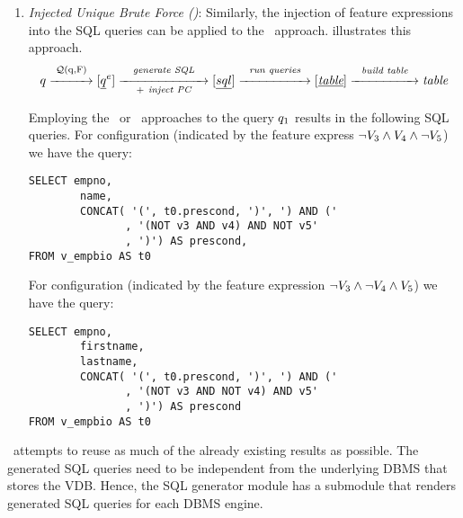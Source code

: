 \begin{enumerate}
\item 
\emph{Injected Unique Brute Force (\ubfi)}:
Similarly, the injection of feature expressions into the SQL queries can be applied to
the \ubf\ approach.  illustrates this approach.
%
\[
\vQ \mathrel{\mathop{\xrightarrow{\hspace*{1cm}}}^{\mathrm{\qGroup \vQ}}} [ \annot [\dimMeta] {\pQ} ] 
\mathrel{\mathop{\xrightarrow{\hspace*{2.3cm}}}^{\mathrm{\textit{generate SQL}}}_{\mathrm{+ \ \textit{inject PC}}}} [ {\sqlQ} ]
\mathrel{\mathop{\xrightarrow{\hspace*{1.8cm}}}^{\mathrm{\textit{run queries}}}
} [\underline{\textit{table}}]
\mathrel{\mathop{\xrightarrow{\hspace*{1.7cm}}}^{\mathrm{\textit{build table}}}
} \textit{table}
\]
%
\begin{example}
\label{eg:ubfi}
Employing the \nbfi\ or \ubfi\ approaches to the query $\vQ_1$ results in the following SQL queries.
For configuration \setDef {\vFour} (indicated by the feature
express $\neg \vThree \wedge \vFour \wedge \neg \vFive$) we have the query:
%
\begin{lstlisting}[basicstyle=\footnotesize\ttfamily,columns=flexible,lineskip=0.5\baselineskip]
SELECT empno, 
        name,
        CONCAT( '(', t0.prescond, ')', ') AND ('
               , '(NOT v3 AND v4) AND NOT v5'
               , ')') AS prescond,
FROM v_empbio AS t0
\end{lstlisting}
%
For configuration \setDef {\vFive} (indicated 
by the feature expression $\neg \vThree \wedge \neg \vFour \wedge \vFive$) we have the
query:
%
\begin{lstlisting}[basicstyle=\footnotesize\ttfamily,columns=flexible,lineskip=0.5\baselineskip]
SELECT empno,
        firstname, 
        lastname,
        CONCAT( '(', t0.prescond, ')', ') AND ('
               , '(NOT v3 AND NOT v4) AND v5'
               , ')') AS prescond
FROM v_empbio AS t0
 \end{lstlisting}
%
\end{example}
\end{enumerate}

\uav\ attempts to reuse as much of the already existing results as possible. 
%
The generated SQL queries need to be independent from the 
underlying DBMS that stores the VDB. Hence, the SQL generator module
has a submodule that renders generated SQL queries for each DBMS engine. 


